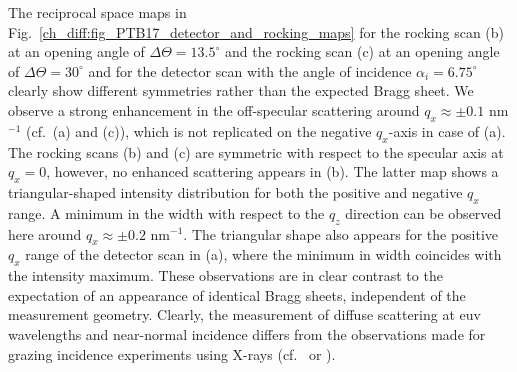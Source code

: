 The reciprocal space maps in Fig.~\ref{ch_diff:fig_PTB17_detector_and_rocking_maps} for the rocking scan (b) at an opening angle of $\Delta \Theta = 13.5^\circ$ and the rocking scan (c) at an opening angle of $\Delta \Theta = 30^\circ$ and for the detector scan with the angle of incidence $\alpha_i = 6.75^\circ$ clearly show different symmetries rather than the expected Bragg sheet. We observe a strong enhancement in the off-specular scattering around $q_x\approx \pm 0.1$ nm$^{-1}$ (cf.~(a) and (c)), which is not replicated on the negative $q_x$-axis in case of (a). The rocking scans (b) and (c) are symmetric with respect to the specular axis at $q_x=0$, however, no enhanced scattering appears in (b). The latter map shows a triangular-shaped intensity distribution for both the positive and 
negative $q_x$ range. A minimum in the width with respect to the $q_z$ direction can be observed here around $q_x \approx \pm 0.2$ nm$^{-1}$. The triangular shape also appears for the 
positive $q_x$ range 
of the detector scan in (a), where the minimum in width coincides with the intensity maximum. These observations are in clear contrast to the expectation of an appearance of identical Bragg sheets, independent of the measurement geometry. Clearly, the measurement of diffuse scattering at \gls{euv} wavelengths and near-normal incidence differs from the observations made for grazing incidence experiments using X-rays (cf.~\textcite{salditt_kinetic_1994} or \textcite{jiang_nonspecular_1992}).

